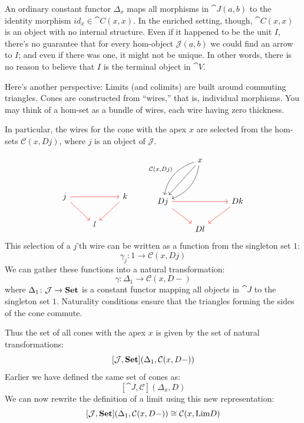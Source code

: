 \documentclass[DaoFP]{subfiles}
\begin{document}
An ordinary constant functor $\Delta_x$ maps all morphisms in $\cat J(a, b)$ to the identity morphism $id_x \in \cat C(x, x)$. In the enriched setting, though, $\cat C(x, x)$ is an object with no internal structure. Even if it happened to be the unit $I$, there's no guarantee that for every hom-object $\mathcal J(a, b)$ we could find an arrow to $I$; and even if there was one, it might not be unique. In other words, there is no reason to believe that $I$ is the terminal object in $\cat V$.


Here's another perspective: Limits (and colimits) are built around commuting triangles. Cones are constructed from ``wires,'' that is, individual morphisms. You may think of a hom-set as a bundle of wires, each wire having zero thickness. 

In particular, the wires for the cone with the apex $x$ are selected from the hom-sets $\mathcal C(x, D j)$, where $j$ is an object of $\mathcal J$. 

\[
 \begin{tikzcd}
 \\
 \\
j
\arrow[rr, red]
\arrow[rd, red]
&& k
\arrow[dl, red]
\\
& l
 \end{tikzcd}
 \qquad
 \begin{tikzcd}
  & x
 \arrow[ddl, ""']
 \arrow[ddl, bend right, "{\mathcal C(x, D j)}"']
 \arrow[ddl, bend left, ""]
 \\
\\
D j
\arrow[rr, red]
\arrow[rd, red]
&& D k
\arrow[dl, red]
\\
& D l
 \end{tikzcd}
 \]
This selection of a $j$'th wire can be written as a function from the singleton set $1$:
\[ \gamma_j \colon 1 \to \mathcal C(x, D j) \]
We can gather these functions into a natural transformation:
\[ \gamma \colon \Delta_1 \to \mathcal C(x, D -) \]
where $\Delta_1 \colon \mathcal{J} \to \mathbf{Set}$ is a constant functor mapping all objects in $\cat J$ to the singleton set $1$. Naturality conditions ensure that the triangles forming the sides of the cone commute. 

Thus the set of all cones  with the apex $x$ is given by the set of natural transformations:
\[ [\mathcal J, \mathbf{Set}] (\Delta_1, \mathcal C(x, D-)) \]
Earlier we have defined the same set of cones as:
\[ [\cat J, \mathcal{C}](\Delta_x, D) \]
We can now rewrite the definition of a limit using this new representation:
\[ [\mathcal J, \mathbf{Set}] (\Delta_1, \mathcal C(x, D-))  \cong \mathcal{C}(x, \text{Lim}D) \]
\end{document}
